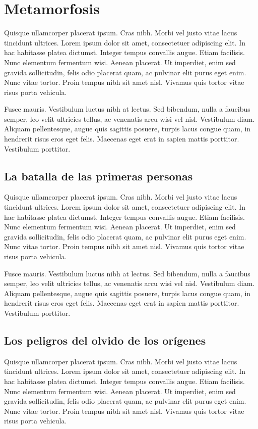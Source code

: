 \chapter{Metamorfosis}

Quisque ullamcorper placerat ipsum. Cras nibh. Morbi vel justo vitae lacus tincidunt ultrices. Lorem ipsum dolor sit amet, consectetuer adipiscing elit. In hac habitasse platea dictumst. Integer tempus convallis augue. Etiam facilisis. Nunc elementum fermentum wisi. Aenean placerat. Ut imperdiet, enim sed gravida sollicitudin, felis odio placerat quam, ac pulvinar elit purus eget enim. Nunc vitae tortor. Proin tempus nibh sit amet nisl. Vivamus quis tortor vitae risus porta vehicula.

Fusce mauris. Vestibulum luctus nibh at lectus. Sed bibendum, nulla a faucibus semper, leo velit ultricies tellus, ac venenatis arcu wisi vel nisl. Vestibulum diam. Aliquam pellentesque, augue quis sagittis posuere, turpis lacus congue quam, in hendrerit risus eros eget felis. Maecenas eget erat in sapien mattis porttitor. Vestibulum porttitor.

\section{La batalla de las primeras personas}

Quisque ullamcorper placerat ipsum. Cras nibh. Morbi vel justo vitae lacus tincidunt ultrices. Lorem ipsum dolor sit amet, consectetuer adipiscing elit. In hac habitasse platea dictumst. Integer tempus convallis augue. Etiam facilisis. Nunc elementum fermentum wisi. Aenean placerat. Ut imperdiet, enim sed gravida sollicitudin, felis odio placerat quam, ac pulvinar elit purus eget enim. Nunc vitae tortor. Proin tempus nibh sit amet nisl. Vivamus quis tortor vitae risus porta vehicula.

Fusce mauris. Vestibulum luctus nibh at lectus. Sed bibendum, nulla a faucibus semper, leo velit ultricies tellus, ac venenatis arcu wisi vel nisl. Vestibulum diam. Aliquam pellentesque, augue quis sagittis posuere, turpis lacus congue quam, in hendrerit risus eros eget felis. Maecenas eget erat in sapien mattis porttitor. Vestibulum porttitor.

\section{Los peligros del olvido de los orígenes}

Quisque ullamcorper placerat ipsum. Cras nibh. Morbi vel justo vitae lacus tincidunt ultrices. Lorem ipsum dolor sit amet, consectetuer adipiscing elit. In hac habitasse platea dictumst. Integer tempus convallis augue. Etiam facilisis. Nunc elementum fermentum wisi. Aenean placerat. Ut imperdiet, enim sed gravida sollicitudin, felis odio placerat quam, ac pulvinar elit purus eget enim. Nunc vitae tortor. Proin tempus nibh sit amet nisl. Vivamus quis tortor vitae risus porta vehicula.

